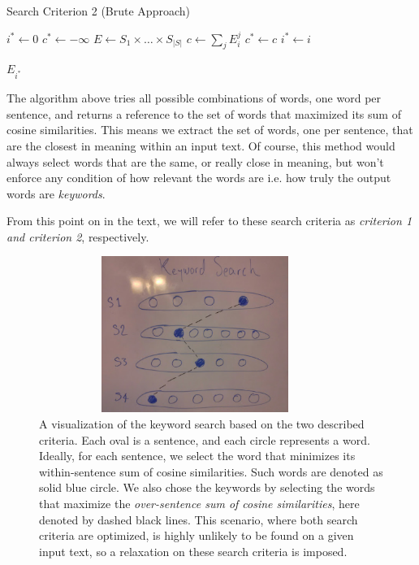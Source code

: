 \documentclass[12pt]{article}
\begin{document}
\begin{algorithm}[H]
\caption{Search Criterion 2 (Brute Approach)}\label{euclid}
\begin{algorithmic}[1]
\State $i^{*} \gets 0 $
\State $c^{*} \gets -\infty$
\State $E \gets S_{1} \times \dots \times S_{|S|}$
\State$c \gets  \sum\limits_{j} E_{i}^{j}$
\State $c^{*} \gets c$
\State$ i^{*} \gets i$

\EndIf
\EndFor
\State \Return $E_{i^{*}}$
\EndProcedure
\end{algorithmic}
\end{algorithm}

The algorithm above tries all possible combinations of words, one word per sentence, and returns a reference to the set of words that maximized its sum of cosine similarities. This means we extract the set of words, one per sentence,  that are the closest in meaning within an input text. Of course, this method would always select words that are the same, or really close in meaning, but won't enforce any condition of how relevant the words are i.e. how truly the output words are \textit{keywords}.


From this point on in the text, we will refer to these search criteria as \textit{criterion 1 and criterion 2}, respectively.



\begin{figure}[H]
\centering
\includegraphics[height=2in, width=4in]{Images/KeywordSearch.png}
\caption{A visualization of the keyword search based on the two described criteria. Each oval is a sentence, and each circle represents a word. Ideally, for each sentence, we select the word that minimizes its within-sentence sum of cosine similarities. Such words are denoted as solid blue circle. We also chose the keywords by selecting the words that maximize the \textit{over-sentence sum of cosine similarities}, here denoted by dashed black lines. This scenario, where both search criteria are optimized, is highly unlikely to be found on a given input text, so a relaxation on these search criteria is imposed.}
\end{figure}
\end{document}
